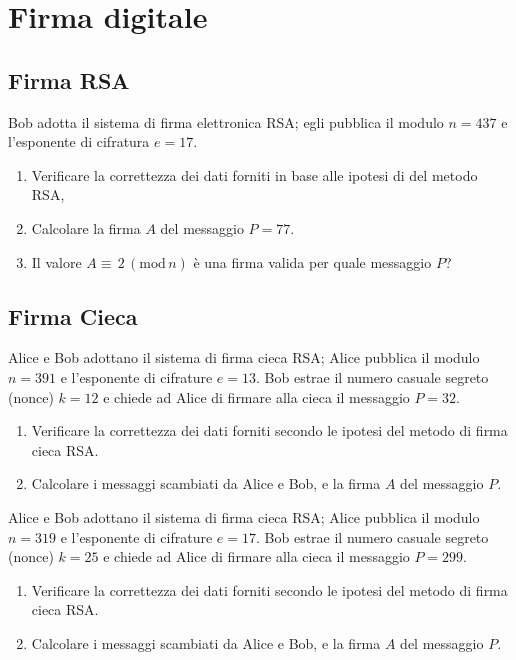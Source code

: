 
\chapter{Firma digitale}

    \bigskip
    \section{Firma RSA}
        Bob adotta il sistema di firma elettronica RSA; egli pubblica il modulo $n=437$ e l'esponente di 
        cifratura $e=17$.
        \begin{enumerate}
            \item Verificare la correttezza dei dati forniti in base alle ipotesi di del metodo RSA,
            \item Calcolare la firma $A$ del messaggio $P=77$.
            \item Il valore $A\equiv\,2\,(\mathrm{mod}\,n)$ è una firma valida per quale messaggio $P$?
        \end{enumerate}

    \bigskip
    \section{Firma Cieca}
        Alice e Bob adottano il sistema di firma cieca RSA; Alice pubblica il modulo $n=391$ e l'esponente 
        di cifrature $e=13$. Bob estrae il numero casuale segreto (nonce) $k=12$ e chiede ad Alice di firmare 
        alla cieca il messaggio $P=32$.
        \begin{enumerate}
            \item Verificare la correttezza dei dati forniti secondo le ipotesi del metodo di firma cieca RSA.
            \item Calcolare i messaggi scambiati da Alice e Bob, e la firma $A$ del messaggio $P$.
        \end{enumerate}

        Alice e Bob adottano il sistema di firma cieca RSA; Alice pubblica il modulo $n=319$ e l'esponente 
        di cifrature $e=17$. Bob estrae il numero casuale segreto (nonce) $k=25$ e chiede ad Alice di firmare 
        alla cieca il messaggio $P=299$.
        \begin{enumerate}
            \item Verificare la correttezza dei dati forniti secondo le ipotesi del metodo di firma cieca RSA.
            \item Calcolare i messaggi scambiati da Alice e Bob, e la firma $A$ del messaggio $P$.
        \end{enumerate}

